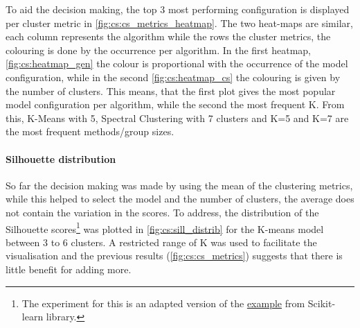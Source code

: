 To aid the decision making, the top 3 most performing configuration is displayed per cluster metric in \cref{fig:cs:cs_metrics_heatmap}. The two heat-maps are similar, each column represents the algorithm while the rows the cluster metrics, the colouring is done by the occurrence per algorithm. In the first heatmap, \cref{fig:cs:heatmap_gen} the colour is proportional with the occurrence of the model configuration, while in the second \cref{fig:cs:heatmap_cs} the colouring is given by the number of clusters. This means, that the first plot gives the most popular model configuration per algorithm, while the second the most frequent K. From this, K-Means with 5, Spectral Clustering with 7 clusters and K=5 and K=7 are the most frequent methods/group sizes. 


\paragraph*{Silhouette distribution}

So far the decision making was made by using the mean of the clustering metrics, while this helped to select the model and the number of clusters, the average does not contain the variation in the scores. To address, the distribution of the Silhouette scores\footnote{The experiment for this is an adapted version of the \href{https://tinyurl.com/sillhouete-distrib}{example} from Scikit-learn library.} was plotted in \cref{fig:cs:sill_distrib} for the K-means model between 3 to 6 clusters. A restricted range of K was used to facilitate the visualisation and the previous results (\cref{fig:cs:cs_metrics}) suggests that there is little benefit for adding more. 


